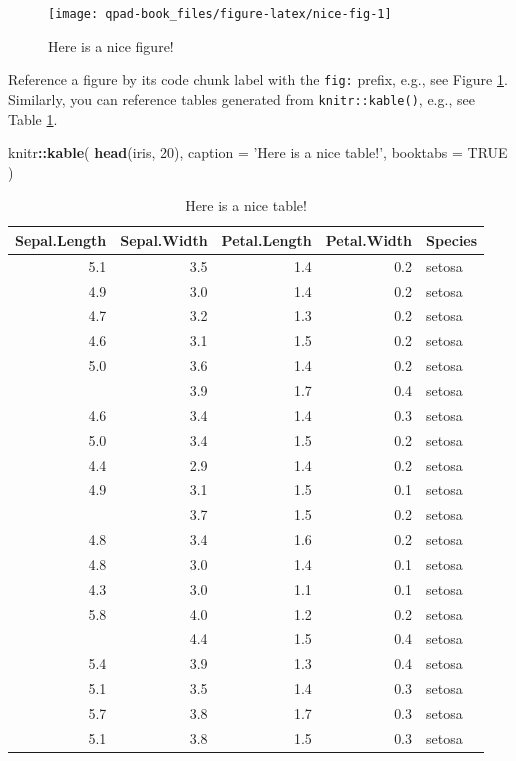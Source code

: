 \documentclass[12pt,]{scrbook}
\newenvironment{Shaded}{\begin{snugshade}}{\end{snugshade}}
\newcommand{\DataTypeTok}[1]{\textcolor[rgb]{0.13,0.29,0.53}{#1}}
\newcommand{\DecValTok}[1]{\textcolor[rgb]{0.00,0.00,0.81}{#1}}
\newcommand{\KeywordTok}[1]{\textcolor[rgb]{0.13,0.29,0.53}{\textbf{#1}}}
\newcommand{\NormalTok}[1]{#1}
\newcommand{\OperatorTok}[1]{\textcolor[rgb]{0.81,0.36,0.00}{\textbf{#1}}}
\newcommand{\OtherTok}[1]{\textcolor[rgb]{0.56,0.35,0.01}{#1}}
\newcommand{\StringTok}[1]{\textcolor[rgb]{0.31,0.60,0.02}{#1}}
\begin{document}
\begin{figure}

{\centering \texttt{[image: qpad-book\_files/figure-latex/nice-fig-1]} 

}

\caption{Here is a nice figure!}\label{fig:nice-fig}
\end{figure}

Reference a figure by its code chunk label with the \texttt{fig:} prefix, e.g., see Figure \ref{fig:nice-fig}. Similarly, you can reference tables generated from \texttt{knitr::kable()}, e.g., see Table \ref{tab:nice-tab}.

\begin{Shaded}
\begin{Highlighting}[]
\NormalTok{knitr}\OperatorTok{::}\KeywordTok{kable}\NormalTok{(}
  \KeywordTok{head}\NormalTok{(iris, }\DecValTok{20}\NormalTok{), }\DataTypeTok{caption =} \StringTok{'Here is a nice table!'}\NormalTok{,}
  \DataTypeTok{booktabs =} \OtherTok{TRUE}
\NormalTok{)}
\end{Highlighting}
\end{Shaded}

\begin{table}[t]

\caption{\label{tab:nice-tab}Here is a nice table!}
\centering
\begin{tabular}{rrrrl}
\toprule
Sepal.Length & Sepal.Width & Petal.Length & Petal.Width & Species\\
\midrule
5.1 & 3.5 & 1.4 & 0.2 & setosa\\
4.9 & 3.0 & 1.4 & 0.2 & setosa\\
4.7 & 3.2 & 1.3 & 0.2 & setosa\\
4.6 & 3.1 & 1.5 & 0.2 & setosa\\
5.0 & 3.6 & 1.4 & 0.2 & setosa\\
\addlinespace
5.4 & 3.9 & 1.7 & 0.4 & setosa\\
4.6 & 3.4 & 1.4 & 0.3 & setosa\\
5.0 & 3.4 & 1.5 & 0.2 & setosa\\
4.4 & 2.9 & 1.4 & 0.2 & setosa\\
4.9 & 3.1 & 1.5 & 0.1 & setosa\\
\addlinespace
5.4 & 3.7 & 1.5 & 0.2 & setosa\\
4.8 & 3.4 & 1.6 & 0.2 & setosa\\
4.8 & 3.0 & 1.4 & 0.1 & setosa\\
4.3 & 3.0 & 1.1 & 0.1 & setosa\\
5.8 & 4.0 & 1.2 & 0.2 & setosa\\
\addlinespace
5.7 & 4.4 & 1.5 & 0.4 & setosa\\
5.4 & 3.9 & 1.3 & 0.4 & setosa\\
5.1 & 3.5 & 1.4 & 0.3 & setosa\\
5.7 & 3.8 & 1.7 & 0.3 & setosa\\
5.1 & 3.8 & 1.5 & 0.3 & setosa\\
\bottomrule
\end{tabular}
\end{table}
\end{document}
